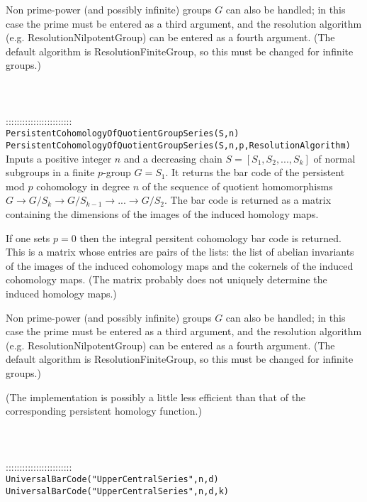 \documentclass[a4paper,11pt]{report}
\begin{document}
{ Non prime-power (and possibly infinite) groups $G$ can also be handled; in this case the prime must be entered as a third
argument, and the resolution algorithm (e.g. ResolutionNilpotentGroup) can be
entered as a fourth argument. (The default algorithm is ResolutionFiniteGroup,
so this must be changed for infinite groups.) \\
 \\
 \\
 \\
 ::::::::::::::::::::::::\\
 \texttt{PersistentCohomologyOfQuotientGroupSeries(S,n)}\\
 \texttt{PersistentCohomologyOfQuotientGroupSeries(S,n,p,Resolution{\textunderscore}Algorithm)}\\
 

 Inputs a positive integer $n$ and a decreasing chain $S=[S_1, S_2, ..., S_k]$ of normal subgroups in a finite $p$-group $G=S_1$. It returns the bar code of the persistent mod $p$ cohomology in degree $n$ of the sequence of quotient homomorphisms $G \rightarrow G/S_k \rightarrow G/S_{k-1} \rightarrow ... \rightarrow G/S_2 $. The bar code is returned as a matrix containing the dimensions of the images
of the induced homology maps. 

 If one sets $p=0$ then the integral persitent cohomology bar code is returned. This is a matrix
whose entries are pairs of the lists: the list of abelian invariants of the
images of the induced cohomology maps and the cokernels of the induced
cohomology maps. (The matrix probably does not uniquely determine the induced
homology maps.) 

 Non prime-power (and possibly infinite) groups $G$ can also be handled; in this case the prime must be entered as a third
argument, and the resolution algorithm (e.g. ResolutionNilpotentGroup) can be
entered as a fourth argument. (The default algorithm is ResolutionFiniteGroup,
so this must be changed for infinite groups.) 

 (The implementation is possibly a little less efficient than that of the
corresponding persistent homology function.) \\
 \\
 \\
 \\
 ::::::::::::::::::::::::\\
 \texttt{UniversalBarCode("UpperCentralSeries",n,d)}\\
 \texttt{UniversalBarCode("UpperCentralSeries",n,d,k)}\\
 

}
\end{document}
